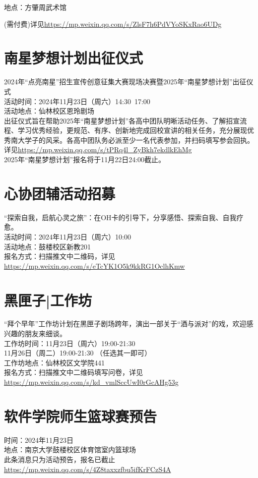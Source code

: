 \documentclass[letterpaper, 12pt]{article}
\begin{document}
\begin{multicols}{2}
地点：方肇周武术馆

(需付费)详见\url{https://mp.weixin.qq.com/s/ZlsF7h6PdVYoSKxRao6UDg}


\section{南星梦想计划出征仪式}
2024年“点亮南星”招生宣传创意征集大赛现场决赛暨2025年“南星梦想计划”出征仪式\\
活动时间：2024年11月23日（周六）14:30~17:00\\
活动地点：仙林校区恩玲剧场\\
出征仪式旨在帮助2025年“南星梦想计划”各高中团队明晰活动任务、了解招宣流程、学习优秀经验，更规范、有序、创新地完成回校宣讲的相关任务，充分展现优秀南大学子的风采。各高中团队务必派至少一名代表参加，并扫码填写参会回执。\\
详见\url{https://mp.weixin.qq.com/s/tPRq4l_ZyBkh7ekdlkEhMg}\\
2025年“南星梦想计划”报名将于11月22日24:00截止。

\section{心协团辅活动招募}
“探索自我，启航心灵之旅”：在OH卡的引导下，分享感悟、探索自我、自我疗愈。\\
活动时间：2024年11月23日（周六）10:00\\
活动地点：鼓楼校区新教201\\
报名方式：扫描推文中二维码，详见\url{https://mp.weixin.qq.com/s/eTcYK1O5k9kkRG1OclhKmw}

\section{黑匣子|工作坊}
“拜个早年”工作坊计划在黑匣子剧场跨年，演出一部关于“酒与派对”的戏，欢迎感兴趣的朋友来细谈。\\
工作坊时间：11月23日（周六）19:00-21:30\\
11月26日（周二）19:00-21:30 （任选其一即可）\\
工作坊地点：仙林校区文学院441\\
报名方式：扫描推文中二维码填写问卷，详见\url{https://mp.weixin.qq.com/s/kd_vmlSccUwI0rGcAHg53g}

\section{软件学院师生篮球赛预告}
时间：2024年11月23日\\
地点：南京大学鼓楼校区体育馆室内篮球场\\
此条消息只为活动预告，报名已截止\url{https://mp.weixin.qq.com/s/4Z8taxxzfbu5ifKrFCzS4A}





\end{multicols}
\end{document}
